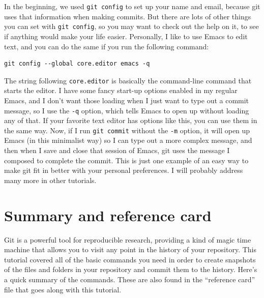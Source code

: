 \documentclass{article}
\begin{document}
In the beginning, we used \texttt{git config} to set up your name and email, because git uses that information when making commits. But there are lots of other things you can set with \texttt{git config}, so you may want to check out the help on it, to see if anything would make your life easier.  Personally, I like to use Emacs to edit text, and you can do the same if you run the following command:


\begin{verbatim}
git config --global core.editor emacs -q
\end{verbatim}

The string following \texttt{core.editor} is basically the command-line command that starts the editor. I have some fancy start-up options enabled in my regular Emacs, and I don't want those loading when I just want to type out a commit message, so I use the \texttt{-q} option, which tells Emacs to open up without loading any of that.  If your favorite text editor has options like this, you can use them in the same way.  Now, if I run \texttt{git commit} without the \texttt{-m} option, it will open up Emacs (in this minimalist way) so I can type out a more complex message, and then when I save and close that session of Emacs, git uses the message I composed to complete the commit.  This is just one example of an easy way to make git fit in better with your personal preferences. I will probably address many more in other tutorials.
\section{Summary and reference card}
\label{sec-11}

Git is a powerful tool for reproducible research, providing a kind of magic time machine that allows you to visit any point in the history of your repository. This tutorial covered all of the basic commands you need in order to create snapshots of the files and folders in your repository and commit them to the history. Here's a quick summary of the commands. These are also found in the ``reference card'' file that goes along with this tutorial.
\end{document}
